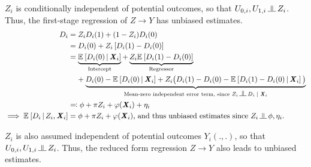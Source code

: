 $Z_i$ is conditionally independent of potential outcomes, so that $U_{0,i}, U_{1,i} \indep Z_i$.
Thus, the first-stage regression of $Z \to Y$ has unbiased estimates.
\begin{align*}
    D_i &= Z_i D_i(1) + (1 - Z_i) D_i(0) \\
        &= D_i(0) +
            Z_i \left[ D_i(1) - D_i(0) \right] \\
        &= \underbrace{\Egiven{D_i(0)}{\vec X_i}        
        }_{\text{Intercept}} +
            \underbrace{Z_i \E{ D_i(1) - D_i(0)}}_{
                \text{Regressor}} \\
            & \;\;\;\; + \underbrace{
                D_i(0) - \Egiven{D_i(0)}{\vec X_i}
                + Z_i \big( D_i(1) - D_i(0) - \Egiven{ D_i(1) - D_i(0)}{\vec X_i}\big)}_{
                \text{Mean-zero independent error term, since }Z_i \indep D_i \; | \; \vec X_i} \\
        &\eqqcolon \phi + \pi Z_i + \varphi(\vec X_i) + \eta_i \\
    \implies \Egiven{D_i}{Z_i, \vec X_i}&=
        \phi + \pi Z_i + \varphi(\vec X_i)
        \text{, and thus unbiased estimates since } Z_i \indep \phi, \eta_i.
\end{align*}

$Z_i$ is also assumed independent of potential outcomes $Y_i(.,.)$, so that $U_{0,i}, U_{1,i} \indep Z_i$.
Thus, the reduced form regression $Z \to Y$ also leads to unbiased estimates.

